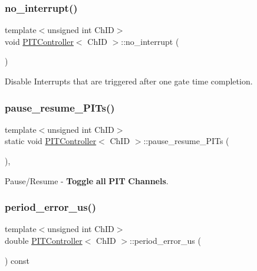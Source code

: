 \subsubsection{\texorpdfstring{no\+\_\+interrupt()}{no\_interrupt()}}
{\footnotesize\ttfamily template$<$unsigned int Ch\+ID$>$ \\
void \hyperlink{classPITController}{P\+I\+T\+Controller}$<$ Ch\+ID $>$\+::no\+\_\+interrupt (\begin{DoxyParamCaption}{ }\end{DoxyParamCaption})\hspace{0.3cm}{\ttfamily [inline]}}



Disable Interrupts that are triggered after one gate time completion. 

\mbox{\label{classPITController_a24b7ea02555967ef945ab87aae338574}} 
\subsubsection{\texorpdfstring{pause\+\_\+resume\+\_\+\+P\+I\+Ts()}{pause\_resume\_PITs()}}
{\footnotesize\ttfamily template$<$unsigned int Ch\+ID$>$ \\
static void \hyperlink{classPITController}{P\+I\+T\+Controller}$<$ Ch\+ID $>$\+::pause\+\_\+resume\+\_\+\+P\+I\+Ts (\begin{DoxyParamCaption}{ }\end{DoxyParamCaption})\hspace{0.3cm}{\ttfamily [inline]}, {\ttfamily [static]}}



Pause/\+Resume -\/ {\bfseries Toggle} {\bfseries all} {\bfseries P\+IT} {\bfseries Channels}. 

\mbox{\label{classPITController_a3fedb5ff5a44b664e8132f4e2836b155}} 
\subsubsection{\texorpdfstring{period\+\_\+error\+\_\+us()}{period\_error\_us()}}
{\footnotesize\ttfamily template$<$unsigned int Ch\+ID$>$ \\
double \hyperlink{classPITController}{P\+I\+T\+Controller}$<$ Ch\+ID $>$\+::period\+\_\+error\+\_\+us (\begin{DoxyParamCaption}{ }\end{DoxyParamCaption}) const\hspace{0.3cm}{\ttfamily [inline]}}




